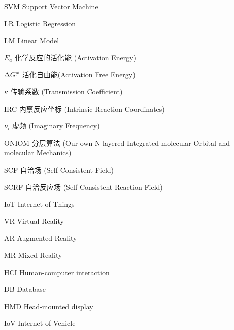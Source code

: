 
\begin{denotation}[3cm]
  \item[SVM] Support Vector Machine
  \item[LR] Logistic Regression
  \item[LM] Linear Model
  \item[$E_a$] 化学反应的活化能 (Activation Energy)
  \item[$\increment G^\neq$] 活化自由能(Activation Free Energy)
  \item[$\kappa$] 传输系数 (Transmission Coefficient)
  \item[IRC] 内禀反应坐标 (Intrinsic Reaction Coordinates)
  \item[$\nu_i$] 虚频 (Imaginary Frequency)
  \item[ONIOM] 分层算法 (Our own N-layered Integrated molecular Orbital and molecular Mechanics)
  \item[SCF] 自洽场 (Self-Consistent Field)
  \item[SCRF] 自洽反应场 (Self-Consistent Reaction Field)
  \item[IoT] Internet of Things
  \item[VR] Virtual Reality
  \item[AR] Augmented Reality
  \item[MR] Mixed Reality
  \item[HCI] Human-computer interaction
  \item[DB] Database
  \item[HMD] Head-mounted display
  \item[IoV] Internet of Vehicle
\end{denotation}





